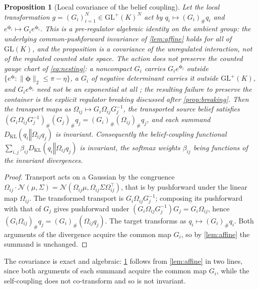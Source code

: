 \documentclass[11pt]{article}
\theoremstyle{plain}
\newtheorem{proposition}{Proposition}[section]
\theoremstyle{definition}
\newcommand{\KL}[2]{D_{\mathrm{KL}}\mathopen{}\left(#1 \mathbin{\Vert} #2\right)\mathclose{}}
\newcommand{\GL}{\mathrm{GL}}
\newcommand{\bphi}{\boldsymbol{\phi}}
\newcommand{\Ncal}{\mathcal{N}}
\newcommand{\Omegaij}{\Omega_{ij}}
\newcommand{\betaij}{\beta_{ij}}
\begin{document}
\begin{proposition}[Local covariance of the belief coupling]
\label{prop:gaugeinv}
Let the local transformation $g=(G_i)_{i=1}^{N}\in\GL^{+}(K)^{N}$ act by
$q_i\mapsto (G_i)_{\#}q_i$ and $e^{\bphi_i}\mapsto G_i e^{\bphi_i}$. This is a
pre-regulator algebraic identity on the ambient group: the underlying common-pushforward
invariance of \cref{lem:affine} holds for all of $\GL(K)$, and the proposition is a
covariance of the unregulated interaction, not of the regulated counted state space.
The action does not preserve the counted gauge chart of \cref{eq:nesting}: a noncompact
$G_i$ carries $G_ie^{\bphi_i}$ outside $\{e^{\bphi}:\|\bphi\|_2\le\pi-\eta\}$, a $G_i$ of
negative determinant carries it outside $\GL^{+}(K)$, and $G_ie^{\bphi_i}$ need not be an
exponential at all \citep{culver1966existence}; the resulting failure to preserve the
container is the explicit regulator breaking discussed after \cref{prop:breaking}. Then the transport
maps as $\Omegaij\mapsto G_i\Omegaij G_j^{-1}$, the transported source belief satisfies
$(G_i\Omegaij G_j^{-1})_{\#}(G_j)_{\#}q_j=(G_i)_{\#}(\Omegaij)_{\#}q_j$, and each summand
$\KL{q_i}{\Omegaij q_j}$ is invariant. Consequently the belief-coupling functional
$\sum_{i,j}\betaij \KL{q_i}{\Omegaij q_j}$ is invariant, the softmax weights $\betaij$
being functions of the invariant divergences.
\end{proposition}

\begin{proof}
Transport acts on a Gaussian by the congruence
$\Omegaij\cdot\Ncal(\mu,\Sigma)=\Ncal(\Omegaij\mu,\Omegaij\Sigma\Omegaij^{\top})$, that is
by pushforward under the linear map $\Omegaij$. The transformed transport is
$G_i\Omegaij G_j^{-1}$; composing its pushforward with that of $G_j$ gives pushforward
under $(G_i\Omegaij G_j^{-1})G_j=G_i\Omegaij$, hence
$(G_i\Omegaij)_{\#}q_j=(G_i)_{\#}(\Omegaij q_j)$. The target transforms as
$q_i\mapsto(G_i)_{\#}q_i$. Both arguments of the divergence acquire the common map $G_i$,
so by \cref{lem:affine} the summand is unchanged.
\end{proof}

The covariance is exact and algebraic: \cref{prop:gaugeinv} follows from \cref{lem:affine}
in two lines, since both arguments of each summand acquire the common map $G_i$, while the
self-coupling does not co-transform and so is not invariant.
\end{document}
